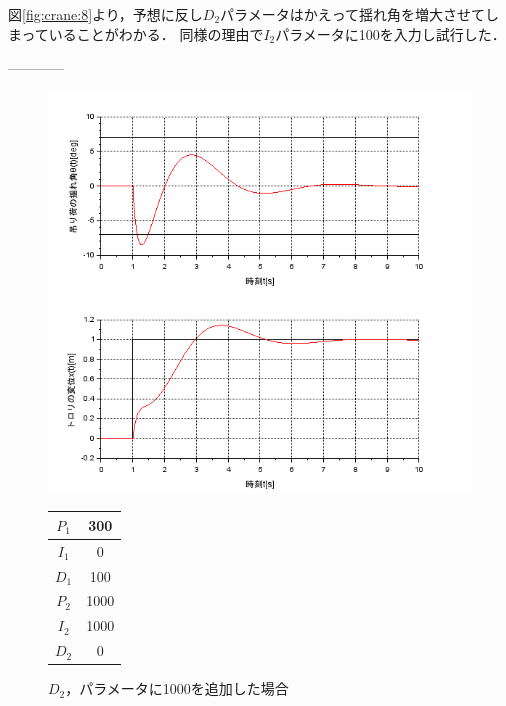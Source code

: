 \documentclass[dvipdfmx,titlepage,a4j]{jsarticle}  %
\begin{document}
図\ref{fig:crane:8}より，予想に反し$D_2$パラメータはかえって揺れ角を増大させてしまっていることがわかる．
同様の理由で$I_2$パラメータに100を入力し試行した．

------------

\begin{figure}[H]
  \begin{minipage}{4.5cm}
    \centering
    \includegraphics[keepaspectratio, scale=0.35]{../graph/crane/ang-P1-300-I1-0-D1-100-P2-1000-I2-1000-D2-0.png}
  \end{minipage}
  \hfill
  \begin{minipage}{4.5cm}
    \centering
    \includegraphics[keepaspectratio, scale=0.35]{../graph/crane/po-P1-300-I1-0-D1-100-P2-1000-I2-1000-D2-0.png}
  \end{minipage}
  \hfill
  \begin{minipage}{3cm}
    \begin{center}
      \begin{tabular}{c|c}
        \hline
        $P_1$ & 300\\ \hline
        $I_1$ & 0\\ \hline
        $D_1$ & 100\\ \hline
        $P_2$ & 1000\\ \hline
        $I_2$ & 1000\\ \hline
        $D_2$ & 0\\
        \hline
      \end{tabular}
    \end{center}
  \end{minipage}
  \hfill
  \caption{$D_2$，パラメータに1000を追加した場合}
  \label{fig:crane:10}
\end{figure}
\end{document}
